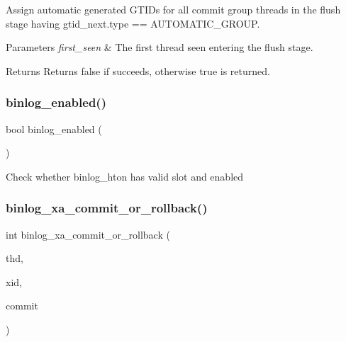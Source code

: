 Assign automatic generated G\+T\+I\+Ds for all commit group threads in the flush stage having gtid\+\_\+next.\+type == A\+U\+T\+O\+M\+A\+T\+I\+C\+\_\+\+G\+R\+O\+UP.


\begin{DoxyParams}{Parameters}
{\em first\+\_\+seen} & The first thread seen entering the flush stage. \\
\hline
\end{DoxyParams}
\begin{DoxyReturn}{Returns}
Returns false if succeeds, otherwise true is returned. 
\end{DoxyReturn}
\mbox{\label{group__Binary__Log_ga46468c405fde69f126c1bcb343c85c90}} 
\subsubsection{\texorpdfstring{binlog\+\_\+enabled()}{binlog\_enabled()}}
{\footnotesize\ttfamily bool binlog\+\_\+enabled (\begin{DoxyParamCaption}{ }\end{DoxyParamCaption})}

Check whether binlog\+\_\+hton has valid slot and enabled \mbox{\label{group__Binary__Log_gab499865e2616dac2a882d7937a62d2aa}} 
\subsubsection{\texorpdfstring{binlog\+\_\+xa\+\_\+commit\+\_\+or\+\_\+rollback()}{binlog\_xa\_commit\_or\_rollback()}}
{\footnotesize\ttfamily int binlog\+\_\+xa\+\_\+commit\+\_\+or\+\_\+rollback (\begin{DoxyParamCaption}\item[{T\+HD $\ast$}]{thd,  }\item[{\mbox{\hyperlink{structxid__t}{X\+ID}} $\ast$}]{xid,  }\item[{bool}]{commit }\end{DoxyParamCaption})\hspace{0.3cm}{\ttfamily [inline]}}

